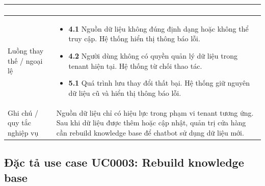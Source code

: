 \documentclass[../DoAn.tex]{subfiles}
\begin{document}
\begin{longtable}{|p{}|p{}|}
\begin{minipage}[t]{0.68\textwidth}
\begin{enumerate}
\end{enumerate}
\end{minipage}
\\
\hline
Luồng thay thế / ngoại lệ &
\begin{minipage}[t]{0.68\textwidth}
\begin{itemize}
    \item \textbf{4.1} Nguồn dữ liệu không đúng định dạng hoặc không thể truy cập. Hệ thống hiển thị thông báo lỗi.
    \item \textbf{4.2} Người dùng không có quyền quản lý dữ liệu trong tenant hiện tại. Hệ thống từ chối thao tác.
    \item \textbf{5.1} Quá trình lưu thay đổi thất bại. Hệ thống giữ nguyên dữ liệu cũ và hiển thị thông báo lỗi.
\end{itemize}
\end{minipage}
\\
\hline
Ghi chú / quy tắc nghiệp vụ & Nguồn dữ liệu chỉ có hiệu lực trong phạm vi tenant tương ứng. Sau khi dữ liệu được thêm hoặc cập nhật, quản trị cửa hàng cần rebuild knowledge base để chatbot sử dụng dữ liệu mới. \\
\hline
\end{longtable}

\subsection{Đặc tả use case UC0003: Rebuild knowledge base}
\label{subsection:2.3.3}
\end{document}
